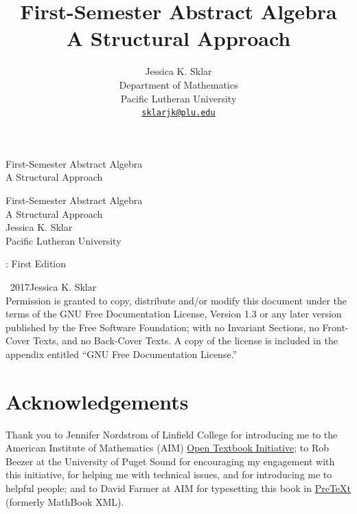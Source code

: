 \documentclass[10pt,]{book}
\title{First-Semester Abstract Algebra\\
{\large A Structural Approach}}
\author{Jessica K. Sklar\\
Department of Mathematics\\
Pacific Lutheran University\\
\href{mailto:sklarjk@plu.edu}{\nolinkurl{sklarjk@plu.edu}}
}
\date{}
\theoremstyle{plain}
\theoremstyle{definition}
\theoremstyle{definition}
\theoremstyle{definition}
\theoremstyle{definition}
\numberwithin{equation}{section}
\begin{document}
\frontmatter
\thispagestyle{empty}
{\centering
\vspace*{0.28\textheight}
{\Huge First-Semester Abstract Algebra}\\[2\baselineskip]
{\LARGE A Structural Approach}\\
}
\clearpage
\thispagestyle{empty}
\null%
\clearpage
\thispagestyle{empty}
{\centering
\vspace*{0.14\textheight}
{\Huge First-Semester Abstract Algebra}\\[\baselineskip]
{\LARGE A Structural Approach}\\[3\baselineskip]
{\Large Jessica K. Sklar}\\[0.5\baselineskip]
{\Large Pacific Lutheran University}\\}
\clearpage
\thispagestyle{empty}
: First Edition\par\medskip
\noindent\textcopyright\ 2017\quad{}Jessica K. Sklar\\[0.5\baselineskip]
Permission is granted to copy, distribute and/or modify this document under the terms of the GNU Free Documentation License, Version 1.3 or any later version published by the Free Software Foundation; with no Invariant Sections, no Front-Cover Texts, and no Back-Cover Texts.  A copy of the license is included in the appendix entitled ``GNU Free Documentation License.''\par\medskip
{}
\null\clearpage
\chapter*{Acknowledgements}\label{acknowledgement-1}
Thank you to Jennifer Nordstrom of Linfield College for introducing me to the American Institute of Mathematics (AIM) \href{https://aimath.org/textbooks/}{Open Textbook Initiative}; to Rob Beezer at the University of Puget Sound for encouraging my engagement with this initiative, for helping me with technical issues, and for introducing me to helpful people; and to David Farmer at AIM for typesetting this book in \href{http://mathbook.pugetsound.edu}{PreTeXt} (formerly MathBook XML).%
\end{document}
